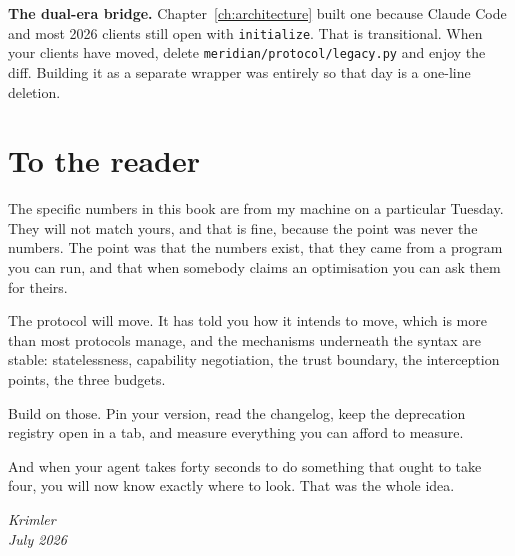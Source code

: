 \textbf{The dual-era bridge.} Chapter~\ref{ch:architecture} built one because
Claude Code and most 2026 clients still open with \texttt{initialize}. That is
transitional. When your clients have moved, delete
\texttt{meridian/protocol/legacy.py} and enjoy the diff. Building it as a separate wrapper was entirely so that day is a one-line
deletion.

\section{To the reader}

The specific numbers in this book are from my machine on a particular Tuesday.
They will not match yours, and that is fine, because the point was never the
numbers. The point was that the numbers exist, that they came from a program you
can run, and that when somebody claims an optimisation you can ask them for
theirs.

The protocol will move. It has told you how it intends to move, which is more
than most protocols manage, and the mechanisms underneath the syntax are stable:
statelessness, capability negotiation, the trust boundary, the interception
points, the three budgets.

Build on those. Pin your version, read the changelog, keep the deprecation
registry open in a tab, and measure everything you can afford to measure.

And when your agent takes forty seconds to do something that ought to take four,
you will now know exactly where to look. That was the whole idea.

\vspace{18pt}
\noindent\emph{Krimler}\\
\emph{July 2026}
